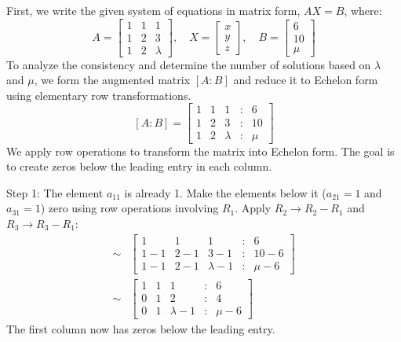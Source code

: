 \documentclass{article}
\begin{document}
First, we write the given system of equations in matrix form, $AX = B$, where:
\[ A = \begin{bmatrix} 1 & 1 & 1 \\ 1 & 2 & 3 \\ 1 & 2 & \lambda \end{bmatrix}, \quad X = \begin{bmatrix} x \\ y \\ z \end{bmatrix}, \quad B = \begin{bmatrix} 6 \\ 10 \\ \mu \end{bmatrix} \]
To analyze the consistency and determine the number of solutions based on $\lambda$ and $\mu$, we form the augmented matrix $[A:B]$ and reduce it to Echelon form using elementary row transformations.
\[ [A:B] = \begin{bmatrix} 1 & 1 & 1 & : & 6 \\ 1 & 2 & 3 & : & 10 \\ 1 & 2 & \lambda & : & \mu \end{bmatrix} \]
We apply row operations to transform the matrix into Echelon form. The goal is to create zeros below the leading entry in each column.

Step 1: The element $a_{11}$ is already 1. Make the elements below it ($a_{21}=1$ and $a_{31}=1$) zero using row operations involving $R_1$.
Apply $R_2 \to R_2 - R_1$ and $R_3 \to R_3 - R_1$:
\begin{align*} \sim &\begin{bmatrix} 1 & 1 & 1 & : & 6 \\ 1 - 1 & 2 - 1 & 3 - 1 & : & 10 - 6 \\ 1 - 1 & 2 - 1 & \lambda - 1 & : & \mu - 6 \end{bmatrix} \\ \sim &\begin{bmatrix} 1 & 1 & 1 & : & 6 \\ 0 & 1 & 2 & : & 4 \\ 0 & 1 & \lambda - 1 & : & \mu - 6 \end{bmatrix}\end{align*}
The first column now has zeros below the leading entry.
\end{document}
